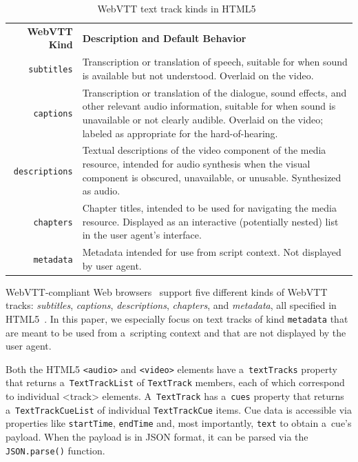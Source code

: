 \documentclass[runningheads,a4paper]{llncs}
\begin{document}
\begin{table}[b!]\footnotesize
\begin{tabular}{ r p{9.5cm} }
\textbf{WebVTT Kind} & \textbf{Description and Default Behavior}\\

\texttt{subtitles} & Transcription or translation of speech,
suitable for when sound is available but not understood.
Overlaid on the video.\\

\texttt{captions} & Transcription or translation of the dialogue,
sound effects, and other relevant audio information,
suitable for when sound is unavailable or not clearly audible.
Overlaid on the video;
labeled as appropriate for the hard-of-hearing.\\

\texttt{descriptions} & Textual descriptions of the video component
of the media resource, intended for audio synthesis
when the visual component is obscured, unavailable, or unusable.
Synthesized as audio.\\

\texttt{chapters} & Chapter titles, intended to be used for navigating
the media resource. Displayed as an interactive (potentially nested)
list in the user agent's interface.\\

\texttt{metadata} & Metadata intended for use from script context.
Not displayed by user agent.\\
\end{tabular}
  \caption{WebVTT text track kinds in HTML5~\cite{berjon2013html5}}
  \label{table:texttrackkinds}
\end{table}

WebVTT-compliant Web browsers~\cite{dutton2012trackelement}
support five different kinds of
WebVTT tracks: \emph{subtitles}, \emph{captions},
\emph{descriptions}, \emph{chapters}, and \emph{metadata},
all specified in HTML5~\cite{berjon2013html5}.
In this paper, we especially focus on
text tracks of kind \texttt{metadata}
that are meant to be used from a~scripting context and
that are not displayed by the user agent.

Both the HTML5 \texttt{<audio>} and \texttt{<video>} elements
have a~\texttt{textTracks} property
that returns a~\texttt{TextTrackList} of
\texttt{TextTrack} members, each of which correspond
to individual <track> elements.
A~\texttt{TextTrack} has a~\texttt{cues} property
that returns a~\texttt{TextTrackCueList} of individual
\texttt{TextTrackCue} items.
Cue data is accessible via properties like
\texttt{startTime}, \texttt{endTime} and,
most importantly, \texttt{text} to obtain a~cue's payload.
When the payload is in JSON format,
it can be parsed via the
\texttt{JSON.parse()} function.
\end{document}
